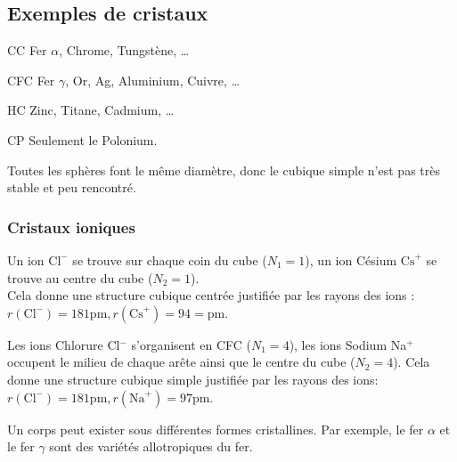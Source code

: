 \subsection*{Exemples de cristaux}
\begin{ex}
    \begin{compactdesc}
        \item[CC] Fer $\alpha$, Chrome, Tungstène, \dots
        \item[CFC] Fer $\gamma$, Or, Ag, Aluminium, Cuivre, \dots
        \item[HC] Zinc, Titane, Cadmium, \dots
        \item[CP] Seulement le Polonium.
    \end{compactdesc}
\end{ex}
\begin{rem}
    Toutes les sphères font le même diamètre, donc le cubique simple n'est pas
    très stable et peu rencontré.
\end{rem}

\subsubsection*{Cristaux ioniques}
\begin{ex}
    Un ion $\text{Cl}^-$ se trouve sur chaque coin du cube ($N_1 = 1$), un ion
    Césium $\text{Cs}^+$ se trouve au centre du cube ($N_2 = 1$).\\
    Cela donne une structure cubique centrée justifiée par les rayons des ions
    : $r(\text{Cl}^-) = 181\text{pm}, r(\text{Cs}^+) = 94 =\text{pm}$.
\end{ex}
\begin{ex}
    Les ions Chlorure Cl$^-$ s'organisent en CFC ($N_1 = 4$), les ions Sodium
    Na$^+$ occupent le milieu de chaque arête ainsi que le centre du cube
    ($N_2 = 4$).
    Cela donne une structure cubique simple justifiée par les rayons des
    ions:
    $r(\text{Cl}^-) = 181\text{pm}, r(\text{Na}^+) = 97\text{pm}$.
\end{ex}

\begin{rem}
    Un corps peut exister sous différentes formes cristallines. Par exemple,
    le fer $\alpha$ et le fer $\gamma$ sont des variétés allotropiques du
    fer.
\end{rem}

